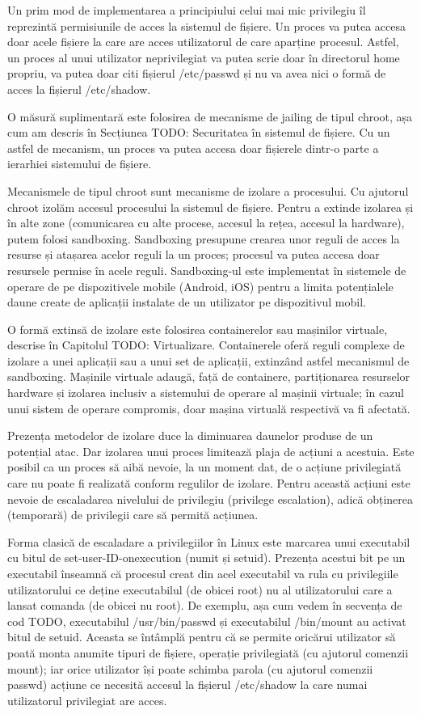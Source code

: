 Un prim mod de implementarea a principiului celui mai mic privilegiu îl reprezintă permisiunile de acces la sistemul de fișiere. Un proces va putea accesa doar acele fișiere la care are acces utilizatorul de care aparține procesul. Astfel, un proces al unui utilizator neprivilegiat va putea scrie doar în directorul home propriu, va putea doar citi fișierul /etc/passwd și nu va avea nici o formă de acces la fișierul /etc/shadow.

O măsură suplimentară este folosirea de mecanisme de jailing de tipul chroot, așa cum am descris în Secțiunea TODO: Securitatea în sistemul de fișiere. Cu un astfel de mecanism, un proces va putea accesa doar fișierele dintr-o parte a ierarhiei sistemului de fișiere.

Mecanismele de tipul chroot sunt mecanisme de izolare a procesului. Cu ajutorul chroot izolăm accesul procesului la sistemul de fișiere. Pentru a extinde izolarea și în alte zone (comunicarea cu alte procese, accesul la rețea, accesul la hardware), putem folosi sandboxing. Sandboxing presupune crearea unor reguli de acces la resurse și atașarea acelor reguli la un proces; procesul va putea accesa doar resursele permise în acele reguli. Sandboxing-ul este implementat în sistemele de operare de pe dispozitivele mobile (Android, iOS) pentru a limita potențialele daune create de aplicații instalate de un utilizator pe dispozitivul mobil.

O formă extinsă de izolare este folosirea containerelor sau mașinilor virtuale, descrise în Capitolul TODO: Virtualizare. Containerele oferă reguli complexe de izolare a unei aplicații sau a unui set de aplicații, extinzând astfel mecanismul de sandboxing. Mașinile virtuale adaugă, față de containere, partiționarea resurselor hardware și izolarea inclusiv a sistemului de operare al mașinii virtuale; în cazul unui sistem de operare compromis, doar mașina virtuală respectivă va fi afectată.

Prezența metodelor de izolare duce la diminuarea daunelor produse de un potențial atac. Dar izolarea unui proces limitează plaja de acțiuni a acestuia. Este posibil ca un proces să aibă nevoie, la un moment dat, de o acțiune privilegiată care nu poate fi realizată conform regulilor de izolare. Pentru această acțiuni este nevoie de escaladarea nivelului de privilegiu (privilege escalation), adică obținerea (temporară) de privilegii care să permită acțiunea.

Forma clasică de escaladare a privilegiilor în Linux este marcarea unui executabil cu bitul de set-user-ID-onexecution (numit și setuid). Prezența acestui bit pe un executabil înseamnă că procesul creat din acel executabil va rula cu privilegiile utilizatorului ce deține executabilul (de obicei root) nu al utilizatorului care a lansat comanda (de obicei nu root). De exemplu, așa cum vedem în secvența de cod TODO, executabilul /usr/bin/passwd și executabilul /bin/mount au activat bitul de setuid. Aceasta se întâmplă pentru că se permite oricărui utilizator să poată monta anumite tipuri de fișiere, operație privilegiată (cu ajutorul comenzii mount); iar orice utilizator își poate schimba parola (cu ajutorul comenzii passwd) acțiune ce necesită accesul la fișierul /etc/shadow la care numai utilizatorul privilegiat are acces.

